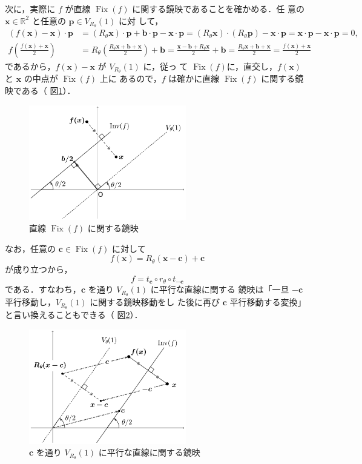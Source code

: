 \documentclass[11pt, uplatex, dvipdfmx, titlepage]{jsarticle}
\DeclareMathOperator{\Fix}{Fix}
\theoremstyle{definition}
\begin{document}
次に，実際に $f$ が直線 $\Fix(f)$ に関する鏡映であることを確かめる．任
意の $\bm{x} \in \mathbb{R}^2$ と任意の $\bm{p} \in V_{R_{\theta}}(1)$ に対
して，
\begin{align*}
  \left( f\left(\bm{x}\right) - \bm{x}\right) \cdot  \bm{p}
  &= (R_{\theta}\bm{x}) \cdot  \bm{p} +\bm{b}\cdot \bm{p}- \bm{x} \cdot \bm{p}
    =(R_{\theta}\bm{x}) \cdot  (R_{\theta}\bm{p})-\bm{x}\cdot \bm{p}
    =\bm{x} \cdot \bm{p} - \bm{x} \cdot  \bm{p}=0,\\
  f\left(\frac{f(\bm{x})+\bm{x}}{2}\right) 
  &= R_{\theta}\left(
    \frac{R_{\theta}\bm{x} + \bm{b} + \bm{x}}{2}\right) + \bm{b}
    =\frac{\bm{x}-\bm{b}+R_{\theta}\bm{x}}{2} + \bm{b}
    =\frac{R_{\theta}\bm{x}+\bm{b} + \bm{x}}{2} = \frac{f(\bm{x})+\bm{x}}{2}
\end{align*}
であるから，$f(\bm{x})-\bm{x}$ が $V_{R_{\theta}}(1)$ に，従っ
て $\Fix(f)$に，直交し，$f(\bm{x})$ と $\bm{x}$ の中点が $\Fix(f)$ 上に
あるので，$f$ は確かに直線 $\Fix(f)$ に関する鏡映である（
図\ref{fig:reflection2gen}）．
\begin{figure}[h]
  \centering
  \includegraphics[height=5cm]{pictures/reflection2gen.pdf}
  \caption{直線 $\Fix(f)$ に関する鏡映}
  \label{fig:reflection2gen}
\end{figure}

なお，任意の $\bm{c} \in \Fix(f)$ に対して
\[
  f(\bm{x}) =  R_{\theta}\left( \bm{x} - \bm{c}\right) + \bm{c}
\]
が成り立つから，
\[
  f = t_{\bm{c}} \circ r_{\theta} \circ t_{-\bm{c}}
\]
である．すなわち，$\bm{c}$ を通り $V_{R_{\theta}}(1)$ に平行な直線に関する
鏡映は「一旦 $-\bm{c}$ 平行移動し，$V_{R_{\theta}}(1)$ に関する鏡映移動をし
た後に再び $\bm{c}$ 平行移動する変換」と言い換えることもできる（
図\ref{fig:reflection2gen2}）．
\begin{figure}[h]
  \centering
  \includegraphics[height=5cm]{pictures/reflection2gen2.pdf}
  \caption{$\bm{c}$ を通り $V_{R_{\theta}}(1)$ に平行な直線に関する鏡映}
  \label{fig:reflection2gen2}
\end{figure}
\end{document}
